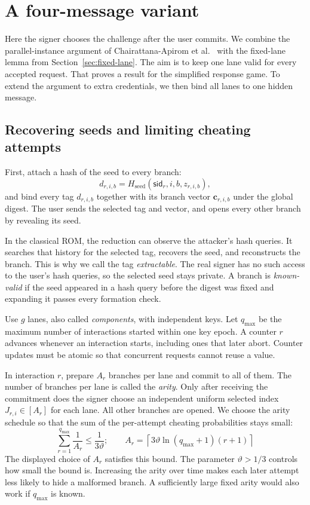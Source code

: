 \documentclass[10pt]{article}
\begin{document}
\section{A four-message variant}
\label{sec:interactive}

Here the signer chooses the challenge after the user commits.  We combine
the parallel-instance argument of Chairattana-Apirom et al.~\cite{PCC22}
with the fixed-lane lemma from Section~\ref{sec:fixed-lane}.  The aim is to
keep one lane valid for every accepted request.  That proves a result for
the simplified response game.  To extend the argument to extra credentials,
we then bind all lanes to one hidden message.

\subsection{Recovering seeds and limiting cheating attempts}

First, attach a hash of the seed to every branch:
\[
 d_{r,i,b}=H_{\mathrm{seed}}(\mathsf{sid}_r,i,b,z_{r,i,b}),
\]
and bind every tag $d_{r,i,b}$ together with its branch vector
$\mathbf c_{r,i,b}$ under the global digest.  The user sends the selected tag and vector,
and opens every other branch by revealing its seed.

In the classical ROM, the reduction can observe the attacker's hash queries.
It searches that history for the selected tag, recovers the seed, and
reconstructs the branch.  This is why we call the tag \emph{extractable}.
The real signer has no such access to the user's hash queries, so the selected
seed stays private.  A branch is \emph{known-valid} if the seed appeared in
a hash query before the digest was fixed and expanding it passes every
formation check.

Use $g$ lanes, also called \emph{components}, with independent keys.  Let
$q_{\max}$ be the maximum number of interactions started within one key
epoch.  A counter $r$ advances whenever an interaction starts, including
ones that later abort.  Counter updates must be atomic so that concurrent
requests cannot reuse a value.

In interaction $r$, prepare $A_r$ branches per lane and commit to all of
them.  The number of branches per lane is called the \emph{arity}.  Only
after receiving the commitment does the signer choose an independent uniform
selected index $J_{r,i}\in[A_r]$ for each lane.  All other branches are
opened.  We choose the arity schedule so that the sum of the per-attempt
cheating probabilities stays small:
\[
 \sum_{r=1}^{q_{\max}}\frac1{A_r}\leq\frac1{3\vartheta};
 \qquad
 A_r=\left\lceil
   3\vartheta\ln(q_{\max}+1)(r+1)
 \right\rceil
\]
The displayed choice of $A_r$ satisfies this bound.  The parameter
$\vartheta>1/3$ controls how small the bound is.  Increasing the arity over
time makes each later attempt less likely to hide a malformed branch.
A sufficiently large fixed arity would also work if $q_{\max}$ is known.
\end{document}
